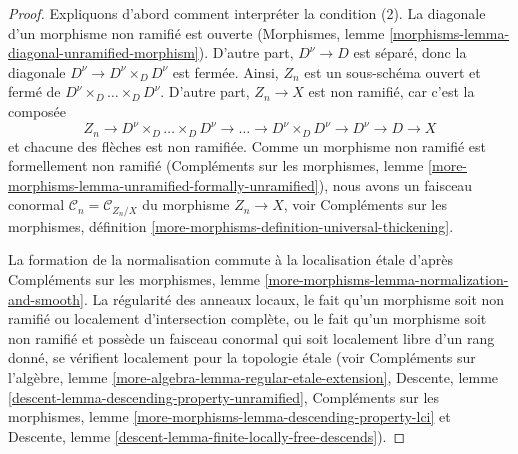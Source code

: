 \begin{proof}
Expliquons d'abord comment interpréter la condition (2).
La diagonale d'un morphisme non ramifié est ouverte
(Morphismes, lemme \ref{morphisms-lemma-diagonal-unramified-morphism}).
D'autre part, $D^\nu \to D$ est séparé, donc la
diagonale $D^\nu \to D^\nu \times_D D^\nu$ est fermée.
Ainsi, $Z_n$ est un sous-schéma ouvert et fermé de
$D^\nu \times_D \ldots \times_D D^\nu$. D'autre part,
$Z_n \to X$ est non ramifié, car c'est la composée
$$
Z_n \to D^\nu \times_D \ldots \times_D D^\nu \to \ldots \to
D^\nu \times_D D^\nu \to D^\nu \to D \to X
$$
et chacune des flèches est non ramifiée.
Comme un morphisme non ramifié est formellement non ramifié
(Compléments sur les morphismes, lemme
\ref{more-morphisms-lemma-unramified-formally-unramified}),
nous avons un faisceau conormal
$\mathcal{C}_n = \mathcal{C}_{Z_n/X}$ du morphisme $Z_n \to X$, voir
Compléments sur les morphismes, définition
\ref{more-morphisms-definition-universal-thickening}.

\medskip\noindent
La formation de la normalisation commute à la localisation \'etale d'après
Compléments sur les morphismes, lemme \ref{more-morphisms-lemma-normalization-and-smooth}.
La régularité des anneaux locaux, le fait
qu'un morphisme soit non ramifié ou localement
d'intersection complète, ou le fait qu'un morphisme soit
non ramifié et possède un faisceau conormal qui soit
localement libre d'un rang donné, se vérifient localement pour la topologie \'etale (voir
Compléments sur l'algèbre, lemme \ref{more-algebra-lemma-regular-etale-extension},
Descente, lemme \ref{descent-lemma-descending-property-unramified},
Compléments sur les morphismes, lemme \ref{more-morphisms-lemma-descending-property-lci}
et
Descente, lemme \ref{descent-lemma-finite-locally-free-descends}).


\end{proof}
